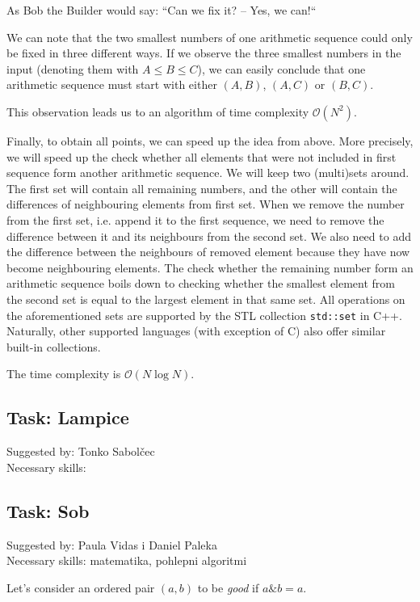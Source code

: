 \documentclass[a4paper]{article}
\begin{document}
As Bob the Builder would say: ``Can we fix it? -- Yes, we can!``

We can note that the two smallest numbers of one arithmetic sequence could only
be fixed in three different ways. If we observe the three smallest numbers in
the input (denoting them with $A \le B \le C$), we can easily conclude that one
arithmetic sequence must start with either $(A, B)$, $(A, C)$ or $(B, C)$.

This observation leads us to an algorithm of time complexity $\mathcal{O}(N^2)$.

Finally, to obtain all points, we can speed up the idea from above. More
precisely, we will speed up the check whether all elements that were
not included in first sequence form another arithmetic sequence. We will
keep two (multi)sets around. The first set will contain all remaining numbers, and
the other will contain the differences of neighbouring elements from first
set. When we remove the number from the first set, i.e. append it to the
first sequence, we need to remove the difference between it and its neighbours
from the second set. We also need to add the difference between the neighbours
of removed element because they have now become neighbouring elements. The check
whether the remaining number form an arithmetic sequence boils down to checking
whether the smallest element from the second set is equal to the largest element
in that same set. All operations on the aforementioned sets are supported
by the STL collection \texttt{std::set} in C++. Naturally, other supported
languages (with exception of C) also offer similar built-in collections.

The time complexity is $\mathcal{O}(N \log N)$.

\subsection*{Task: Lampice}
\textsf{Suggested by: Tonko Sabolčec}\\
\textsf{Necessary skills: }

\subsection*{Task: Sob}
\textsf{Suggested by: Paula Vidas i Daniel Paleka}\\
\textsf{Necessary skills: matematika, pohlepni algoritmi}

Let's consider an ordered pair $(a, b)$ to be \emph{good} if $a \mathbin\& b = a$.
\end{document}
